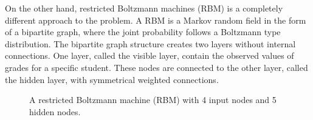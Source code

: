 \documentclass[12pt]{article}
\begin{document}
On the other hand, restricted Boltzmann machines (RBM) is a
completely different approach to the problem.
A RBM is a Markov random field in the form of a bipartite graph,
where the joint probability follows a Boltzmann type distribution.
The bipartite graph structure creates two layers without
internal connections.
One layer, called the visible layer, contain the 
observed values of grades for a specific student.
These nodes are connected to the other layer, called the hidden layer,
with symmetrical weighted connections.
%
\def\layersep{2.5cm}
\begin{figure}[h]
\centering{}

\caption{\label{fig:RBM}
A restricted Boltzmann machine (RBM) with 4 input nodes and 
5 hidden nodes.
}
\end{figure}
\end{document}
